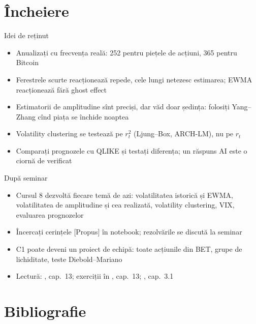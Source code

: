 \section{Încheiere}

\begin{frame}{Idei de reținut}
\itemsize{\small}
\begin{itemize}
    \item Anualizați cu frecvența reală: 252 pentru piețele de acțiuni, 365 pentru Bitcoin
    \item Ferestrele scurte reacționează repede, cele lungi netezesc estimarea; EWMA reacționează fără ghost effect
    \item Estimatorii de amplitudine sînt preciși, dar văd doar ședința: folosiți Yang--Zhang cînd piața se închide noaptea
    \item Volatility clustering se testează pe $r_t^2$ (Ljung--Box, ARCH-LM), nu pe $r_t$
    \item Comparați prognozele cu QLIKE și testați diferența; un răspuns AI este o ciornă de verificat
\end{itemize}
\end{frame}

\begin{frame}{După seminar}
\itemsize{\small}
\begin{itemize}
    \item Cursul 8 dezvoltă fiecare temă de azi: volatilitatea istorică și EWMA, volatilitatea de amplitudine și cea realizată, volatility clustering, VIX, evaluarea prognozelor
    \item Încercați cerințele [Propus] în notebook; rezolvările se discută la seminar
    \item C1 poate deveni un proiect de echipă: toate acțiunile din BET, grupe de lichiditate, teste Diebold--Mariano
    \item Lectură: , cap.~13; exerciții în , cap.~13; , cap.~3.1
\end{itemize}
\end{frame}


\section{Bibliografie}

